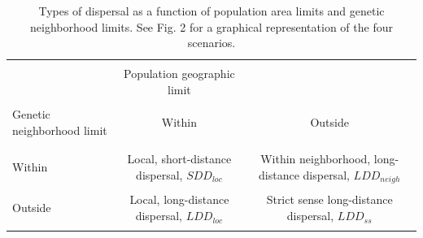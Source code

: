 \documentclass[a4paper, 12pt]{article}
\begin{document}
\pagestyle{empty}
\begin{landscape}
	\headheight     3cm
\begin{table}
\captionsetup{width=20cm}%
\caption{Types of dispersal as a function of population area limits and genetic neighborhood limits. See Fig. 2 for a graphical representation of the four scenarios.}
\vspace{0.5cm}
  \begin{tabular}{lcc}
    \hline
\\&Population geographic limit    &  \\\\
Genetic neighborhood limit     &Within &Outside \\\\
    \hline
\\Within  &  Local, short-distance dispersal, $SDD_{loc}$  
          &  Within neighborhood, long-distance dispersal, $LDD_{neigh}$ \\\\
Outside   &  Local, long-distance dispersal, $LDD_{loc}$    
          &  Strict sense long-distance dispersal, $LDD_{ss}$\\\\ 
    \hline
  \end{tabular}
\end{table}
\end{landscape}

\newpage
\end{document}
